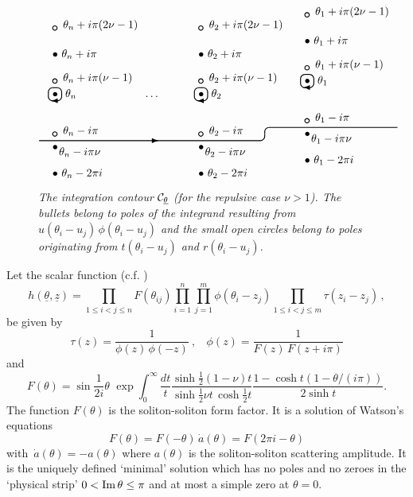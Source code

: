 \documentclass[a4paper,a4paper]{article}
\begin{document}
\begin{figure}[tbh]
\[
\unitlength4.2mm%
\begin{picture}(27,13)
\thicklines
\put(1,0){
\put(0,0){$\bullet~\theta_n-2\pi i$}
\put(0,2){$\bullet$}\put(.5,1.6){$\theta_n-i\pi\nu$}
\put(.19,3.2){\circle{.3}~$\theta_n-i\pi$}
\put(0,6){$\bullet~~\theta_n$}
\put(.2,6.2){\oval(1,1)}\put(-.1,5.71){\vector(-1,0){0}}
\put(.19,7.2){\circle{.3}~$\theta_n+i\pi(\nu-1)$}
\put(0,9){$\bullet~\theta_n+i\pi$}
\put(.19,11.2){\circle{.3}~$\theta_n+i\pi(2\nu-1)$}
}
\put(8,6){\dots}
\put(12,0){
\put(0,0){$\bullet~\theta_2-2\pi i$}
\put(0,2){$\bullet$}\put(.5,1.6){$\theta_2-i\pi\nu$}
\put(.19,3.2){\circle{.3}~$\theta_2-i\pi$}
\put(0,6){$\bullet~~\theta_2$}
\put(.2,6.2){\oval(1,1)}\put(-.1,5.71){\vector(-1,0){0}}
\put(.19,7.2){\circle{.3}~$\theta_2+i\pi(\nu-1)$}
\put(0,9){$\bullet~\theta_2+i\pi$}
\put(.19,11.2){\circle{.3}~$\theta_2+i\pi(2\nu-1)$}
}
\put(20,1){
\put(0,0){$\bullet~\theta_1-2\pi i$}
\put(0,2){$\bullet$}\put(.5,1.6){$\theta_1-i\pi\nu$}
\put(.19,3.2){\circle{.3}~$\theta_1-i\pi$}
\put(0,6){$\bullet~~\theta_1$}
\put(.2,6.2){\oval(1,1)}\put(-.1,5.71){\vector(-1,0){0}}
\put(.19,7.2){\circle{.3}~$\theta_1+i\pi(\nu-1)$}
\put(0,9){$\bullet~\theta_1+i\pi$}
\put(.19,11.2){\circle{.3}~$\theta_1+i\pi(2\nu-1)$}
}
\put(9,2.7){\vector(1,0){0}}
\put(0,3.2){\oval(34,1)[br]}
\put(27,3.2){\oval(20,1)[tl]}
\end{picture}
\]
\caption{\textit{The integration contour $\mathcal{C_{\protect\underline{%
\theta }}}$ (for the repulsive case $\nu >1$). The bullets belong to poles
of the integrand resulting from $u(\theta _{i}-u_{j})\,\phi (\theta
_{i}-u_{j})$ and the small open circles belong to poles originating from $%
t(\theta _{i}-u_{j})$ and $r(\theta _{i}-u_{j})$. }}
\label{f5.1}
\end{figure}
Let the scalar function (c.f. \cite{BFKZ}) 
\begin{equation}
h(\underline{\theta },{\underline{z}})=\prod_{1\le i<j\le n}F(\theta
_{ij})\prod_{i=1}^{n}\prod_{j=1}^{m}\phi (\theta _{i}-z_{j})\prod_{1\le
i<j\le m}\tau (z_{i}-z_{j})\,,  \label{1.3}
\end{equation}
be given by 
\begin{equation}
\tau (z)=\frac{1}{\phi (z)\,\phi (-z)}~,~~~~\phi (z)=\frac{1}{F(z)\,F(z+i\pi
)}  \label{1.4}
\end{equation}
and 
\begin{equation}
F(\theta )=\sin \frac{1}{2i}\theta \,\,\exp \int_{0}^{\infty }\frac{dt}{t}%
\frac{\sinh \frac{1}{2}(1-\nu )t}{\sinh \frac{1}{2}\nu t\,\cosh \frac{1}{2}t}%
\frac{1-\cosh t(1-\theta /(i\pi ))}{2\sinh t}.  \label{1.7}
\end{equation}
The function $F(\theta )$ is the soliton-soliton form factor. It is a
solution of Watson's equations 
\begin{equation}
F(\theta )=F(-\theta )\,\dot{a}(\theta )=F(2\pi i-\theta )  \label{2.12}
\end{equation}
with $\,\dot{a}(\theta )=-a(\theta )$ where $a(\theta )$ is the
soliton-soliton scattering amplitude. It is the uniquely defined `minimal'
solution \cite{KW} which has no poles and no zeroes in the `physical strip' $%
0<\mathop{\rm Im}\theta \leq \pi $ and at most a simple zero at $\theta =0$.
\end{document}
